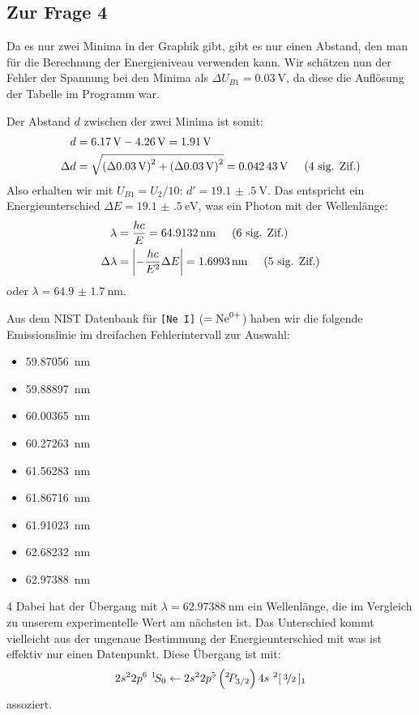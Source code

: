 	\subsection{Zur Frage 4}
		Da es nur zwei Minima in der Graphik gibt, gibt es nur einen Abstand, den man für die Berechnung der Energieniveau verwenden kann. Wir schätzen nun der Fehler der Spannung bei den Minima als $\Delta U_{B1} = \SI{0.03}{\volt}$, da diese die Auflösung der Tabelle im Programm war. 

		Der Abstand $d$ zwischen der zwei Minima ist somit:
		\begin{align}
			d &= \SI{6.17}{\volt} - \SI{4.26}{\volt} = \SI{1.91}{\volt} \\
			\Delta d &= \addquad{\SI{0.03}{\volt}, \SI{0.03}{\volt}} = \SI{0.04243}{\volt} \sigfig{4}
		\end{align}
		Also erhalten wir mit $U_{B1} = U_2 / 10$: $d' = \SI{19.1(5)}{\volt}$. Das entspricht ein Energieunterschied $\Delta E = \SI{19.1(5)}{\electronvolt}$, was ein Photon mit der Wellenlänge:
		\begin{align}
			\lambda &= \frac{hc}{E} = \SI{64.9132}{\nano\meter} \hspace{0.5cm}\text{(6 sig. Zif.)} \\
			\Delta \lambda &= \abs{-\frac{hc}{E^2}\Delta E} = \SI{1.6993}{\nano\meter} \hspace{0.5cm}\text{(5 sig. Zif.)}
		\end{align}
		oder $\lambda = \SI{64.9(17)}{\nano\meter}$.

		Aus dem NIST Datenbank \citep{NIST_ASD} für \texttt{[Ne I]} ($= \ce{Ne^{0+}}$) haben wir die folgende Emissionslinie im dreifachen Fehlerintervall zur Auswahl:
		\begin{multicols}{3}
		 	\begin{itemize}
		 		\item \SI{59.87056}{\nano\meter}
				\item \SI{59.88897}{\nano\meter}
				\item \SI{60.00365}{\nano\meter}
				\item \SI{60.27263}{\nano\meter}
				\item \SI{61.56283}{\nano\meter}
				\item \SI{61.86716}{\nano\meter}
				\item \SI{61.91023}{\nano\meter}
				\item \SI{62.68232}{\nano\meter}
				\item \SI{62.97388}{\nano\meter}
		 	\end{itemize}
		\end{multicols}{4} 
		Dabei hat der Übergang mit $\lambda = \SI{62.97388}{\nano\meter}$ ein Wellenlänge, die im Vergleich zu unserem experimentelle Wert am nächsten ist. Das Unterschied kommt vielleicht aus der ungenaue Bestimmung der Energieunterschied mit was ist effektiv nur einen Datenpunkt. Diese Übergang ist mit:
		\begin{align*}
			2s^22p^6~^1\!S_0 
			\leftarrow 
			2s^22p^5\left(^2\!P_{3/2}\right)4s~^2[\,\nicefrac{3}{2}\,]_1
		\end{align*}
		assoziert.

